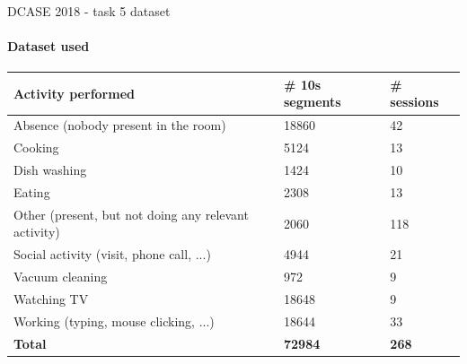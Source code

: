 \documentclass[aspectratio=169, professionalfonts]{beamer}
\begin{document}
\begin{frame}{DCASE 2018 - task 5 dataset}
    \framesubtitle{Dataset used}
    \begin{table}[htbp]
        \centering
    	\label{tab:DCASE-activiies-performed}
    	\small
        \begin{tabular}{l|l|l}
            \toprule
            \textbf{Activity performed} & \textbf{\# 10s segments} & \textbf{\# sessions} \\ 
            \midrule[1pt]
            Absence (nobody present in the room) & 18860 & 42 \\
            \hline
            Cooking & 5124 & 13 \\ 
            \hline
            Dish washing & 1424 & 10 \\ 
            \hline
            Eating & 2308 & 13 \\ 
            \hline
            Other (present, but not doing any relevant activity) & 2060 & 118 \\ 
            \hline
            Social activity (visit, phone call, ...) & 4944 & 21 \\ 
            \hline
            Vacuum cleaning & 972 & 9 \\ 
            \hline
            Watching TV & 18648 & 9 \\ 
            \hline
            Working (typing, mouse clicking, ...) & 18644 & 33 \\ 
            \midrule[1pt]
            \textbf{Total} & \textbf{72984} & \textbf{268} \\
            \bottomrule
        \end{tabular}
    \end{table}
\end{frame}
\end{document}
